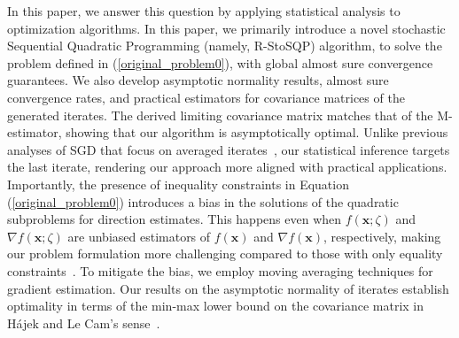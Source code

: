 \documentclass[aos]{imsart}
\numberwithin{equation}{section}
\theoremstyle{plain}
\begin{document}
In this paper, we answer this question by applying statistical analysis to optimization algorithms. In this paper, we primarily introduce a novel stochastic Sequential Quadratic Programming (namely, R-StoSQP) algorithm, to solve the problem defined in (\ref{original_problem0}), with global almost sure convergence guarantees.
We also develop asymptotic normality results, almost sure convergence rates, and practical estimators for covariance matrices of the generated iterates. The derived limiting covariance matrix matches that of the M-estimator, showing that our algorithm is asymptotically optimal. 
Unlike previous analyses of SGD that focus on averaged iterates~\cite{polyak1992acceleration, chen2020statistical}, our statistical inference targets the last iterate, rendering our approach more aligned with practical applications.
Importantly, the presence of inequality constraints in Equation (\ref{original_problem0}) introduces a bias in the solutions of the quadratic subproblems for direction estimates. This happens even when $f(\bm{x}; \zeta)$ and $\nabla f(\bm{x}; \zeta)$ are unbiased estimators of $f(\bm{x})$ and $\nabla f(\bm{x})$, respectively, making our problem formulation more challenging compared to those with only equality constraints~\cite{berahas2021sequential, na2022asymptotic}. To mitigate the bias, we employ moving averaging techniques for gradient estimation. Our results on the asymptotic normality of iterates establish optimality in terms of the min-max lower bound on the covariance matrix in H\'ajek and Le Cam's sense~\cite{duchi2021asymptotic}.
\end{document}
